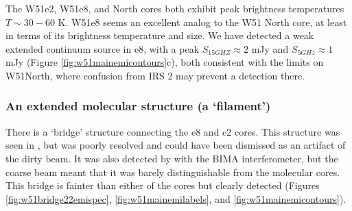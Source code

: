 




The W51e2, W51e8, and North cores both exhibit peak brightness temperatures
$T\sim30-60$ K.  W51e8 seems an excellent analog to the W51 North core, at
least in terms of its brightness temperature and size.  We have detected a weak
extended continuum source in e8, with a peak $S_{15 GHZ} \approx 2$ mJy and
$S_{5 GHz} \approx 1$ mJy (Figure \ref{fig:w51mainemicontours}c), both
consistent with the limits on W51North, where confusion from IRS 2 may prevent
a detection there.

\subsubsection{An extended molecular structure (a `filament')}
\label{sec:bridgefilament}
There is a `bridge' structure connecting the e8 and e2 cores.  This structure
was seen in \citet{Zhang1997a}, but was poorly resolved and could have been
dismissed as an artifact of the dirty beam.  It was also detected by
\citet{Tang2009a} with the BIMA interferometer, but the coarse beam meant that
it was barely distinguishable from the molecular cores.  This bridge is fainter
than either of the cores but clearly detected (Figures
\ref{fig:w51bridge22emispec}, \ref{fig:w51mainemilabels}, and
\ref{fig:w51mainemicontours}).

